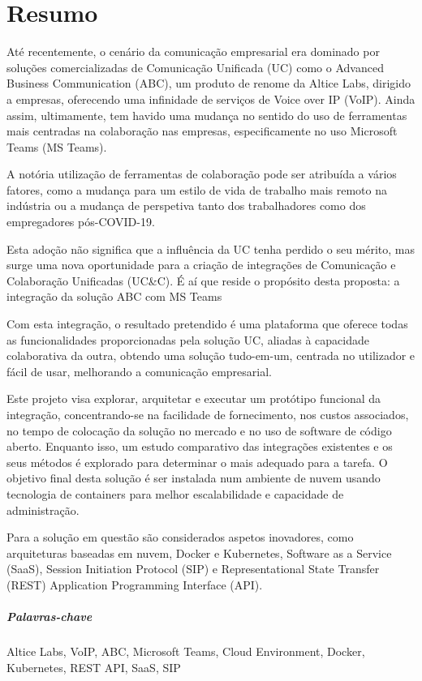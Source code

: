 \cleardoublepage

\chapter*{Resumo}

Até recentemente, o cenário da comunicação empresarial era dominado por soluções comercializadas de Comunicação Unificada (UC) como o Advanced Business Communication (ABC), um produto de renome da Altice Labs, dirigido a empresas, oferecendo uma infinidade de serviços de Voice over IP (VoIP). Ainda assim, ultimamente, tem havido uma mudança no sentido do uso de ferramentas mais centradas na colaboração nas empresas, especificamente no uso Microsoft Teams (MS Teams).

A notória utilização de ferramentas de colaboração pode ser atribuída a vários fatores, como a mudança para um estilo de vida de trabalho mais remoto na indústria ou a mudança de perspetiva tanto dos trabalhadores como dos empregadores pós-COVID-19.

Esta adoção não significa que a influência da UC tenha perdido o seu mérito, mas surge uma nova oportunidade para a criação de integrações de Comunicação e Colaboração Unificadas (UC\&C). É aí que reside o propósito desta proposta: a integração da solução ABC com MS Teams

Com esta integração, o resultado pretendido é uma plataforma que oferece todas as funcionalidades proporcionadas pela solução UC, aliadas à capacidade colaborativa da outra, obtendo uma solução tudo-em-um, centrada no utilizador e fácil de usar, melhorando a comunicação empresarial.

Este projeto visa explorar, arquitetar e executar um protótipo funcional da integração, concentrando-se na facilidade de fornecimento, nos custos associados, no tempo de colocação da solução no mercado e no uso de software de código aberto. Enquanto isso, um estudo comparativo das integrações existentes e os seus métodos é explorado para determinar o mais adequado para a tarefa. O objetivo final desta solução é ser instalada num ambiente de nuvem usando tecnologia de containers para melhor escalabilidade e capacidade de administração.

Para a solução em questão são considerados aspetos inovadores, como arquiteturas baseadas em nuvem, Docker e Kubernetes, Software as a Service (SaaS), Session Initiation Protocol (SIP) e Representational State Transfer (REST) Application Programming Interface (API).

\paragraph{Palavras-chave} Altice Labs, VoIP, ABC, Microsoft Teams, Cloud Environment, Docker, Kubernetes, REST API, SaaS, SIP

\cleardoublepage

